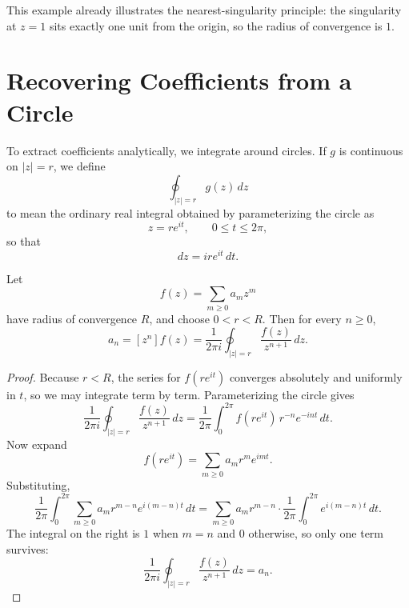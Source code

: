 This example already illustrates the nearest-singularity principle: the singularity at $z=1$ sits exactly one unit from the origin, so the radius of convergence is $1$.

\section{Recovering Coefficients from a Circle}

To extract coefficients analytically, we integrate around circles. If $g$ is continuous on $|z|=r$, we define
\[
  \oint_{|z|=r} g(z)\,dz
\]
to mean the ordinary real integral obtained by parameterizing the circle as
\[
  z = re^{it}, \qquad 0 \le t \le 2\pi,
\]
so that
\[
  dz = i r e^{it}\,dt.
\]

\begin{center}
\end{center}

\begin{proposition}
Let
\[
  f(z) = \sum_{m \ge 0} a_m z^m
\]
have radius of convergence $R$, and choose $0<r<R$. Then for every $n \ge 0$,
\[
  a_n = [z^n]f(z) = \frac{1}{2\pi i}\oint_{|z|=r} \frac{f(z)}{z^{n+1}}\,dz.
\]
\end{proposition}

\begin{proof}
Because $r<R$, the series for $f(re^{it})$ converges absolutely and uniformly in $t$, so we may integrate term by term. Parameterizing the circle gives
\[
  \frac{1}{2\pi i}\oint_{|z|=r} \frac{f(z)}{z^{n+1}}\,dz
  = \frac{1}{2\pi}\int_0^{2\pi} f(re^{it})\, r^{-n} e^{-int}\,dt.
\]
Now expand
\[
  f(re^{it}) = \sum_{m \ge 0} a_m r^m e^{imt}.
\]
Substituting,
\[
  \frac{1}{2\pi}\int_0^{2\pi} \sum_{m \ge 0} a_m r^{m-n} e^{i(m-n)t}\,dt
  = \sum_{m \ge 0} a_m r^{m-n} \cdot \frac{1}{2\pi}\int_0^{2\pi} e^{i(m-n)t}\,dt.
\]
The integral on the right is $1$ when $m=n$ and $0$ otherwise, so only one term survives:
\[
  \frac{1}{2\pi i}\oint_{|z|=r} \frac{f(z)}{z^{n+1}}\,dz = a_n.
\]
\end{proof}

